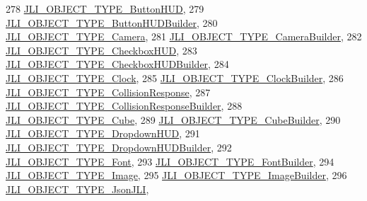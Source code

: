 \begin{DoxyCode}
278     \mbox{\hyperlink{namespacenjli_a6d56d4fbaf89fcf3e3d32839df05b444a62110b03da1994b0e37ca24dd2b03f07}{JLI\_OBJECT\_TYPE\_ButtonHUD}},
279     \mbox{\hyperlink{namespacenjli_a6d56d4fbaf89fcf3e3d32839df05b444a24f3abae4380331c9e4fc0e6dd98d990}{JLI\_OBJECT\_TYPE\_ButtonHUDBuilder}},
280     \mbox{\hyperlink{namespacenjli_a6d56d4fbaf89fcf3e3d32839df05b444a584b5378242583bfb37a7dc963809cd4}{JLI\_OBJECT\_TYPE\_Camera}},
281     \mbox{\hyperlink{namespacenjli_a6d56d4fbaf89fcf3e3d32839df05b444a1bf94aa0f345c5e503277edd7e9a3639}{JLI\_OBJECT\_TYPE\_CameraBuilder}},
282     \mbox{\hyperlink{namespacenjli_a6d56d4fbaf89fcf3e3d32839df05b444aeea430e40ffbf6287e6f45b92283f5c6}{JLI\_OBJECT\_TYPE\_CheckboxHUD}},
283     \mbox{\hyperlink{namespacenjli_a6d56d4fbaf89fcf3e3d32839df05b444a30766bd9b3a037c8cdf8b8ee28f19b42}{JLI\_OBJECT\_TYPE\_CheckboxHUDBuilder}},
284     \mbox{\hyperlink{namespacenjli_a6d56d4fbaf89fcf3e3d32839df05b444a767c5c9686befe91336f8f4f6f29e260}{JLI\_OBJECT\_TYPE\_Clock}},
285     \mbox{\hyperlink{namespacenjli_a6d56d4fbaf89fcf3e3d32839df05b444a485adc2590e096485b63286c788a8c17}{JLI\_OBJECT\_TYPE\_ClockBuilder}},
286     \mbox{\hyperlink{namespacenjli_a6d56d4fbaf89fcf3e3d32839df05b444af8ce52738a5eaa88f7a9d117c0f540b7}{JLI\_OBJECT\_TYPE\_CollisionResponse}},
287     \mbox{\hyperlink{namespacenjli_a6d56d4fbaf89fcf3e3d32839df05b444aca96e33eb2a43c80baafa6b3eda76e3a}{JLI\_OBJECT\_TYPE\_CollisionResponseBuilder}},
288     \mbox{\hyperlink{namespacenjli_a6d56d4fbaf89fcf3e3d32839df05b444adbf14f548d0deb2a84a8a1b3d09bd154}{JLI\_OBJECT\_TYPE\_Cube}},
289     \mbox{\hyperlink{namespacenjli_a6d56d4fbaf89fcf3e3d32839df05b444af701d97c06bbbed74b71cf411a0603a1}{JLI\_OBJECT\_TYPE\_CubeBuilder}},
290     \mbox{\hyperlink{namespacenjli_a6d56d4fbaf89fcf3e3d32839df05b444a3968716659c91fd4e987e9457e406438}{JLI\_OBJECT\_TYPE\_DropdownHUD}},
291     \mbox{\hyperlink{namespacenjli_a6d56d4fbaf89fcf3e3d32839df05b444ab9cc17fc8fcfbe7309f0406fe69a94b4}{JLI\_OBJECT\_TYPE\_DropdownHUDBuilder}},
292     \mbox{\hyperlink{namespacenjli_a6d56d4fbaf89fcf3e3d32839df05b444a7c098ff563bd0f745a222f1c38d52156}{JLI\_OBJECT\_TYPE\_Font}},
293     \mbox{\hyperlink{namespacenjli_a6d56d4fbaf89fcf3e3d32839df05b444a5e35bb12a3036c88f6296758787c0b86}{JLI\_OBJECT\_TYPE\_FontBuilder}},
294     \mbox{\hyperlink{namespacenjli_a6d56d4fbaf89fcf3e3d32839df05b444a09495040dd94be9914a21e6c6d4e9a5d}{JLI\_OBJECT\_TYPE\_Image}},
295     \mbox{\hyperlink{namespacenjli_a6d56d4fbaf89fcf3e3d32839df05b444acf74028d2f297bab038e3ef5fd78c546}{JLI\_OBJECT\_TYPE\_ImageBuilder}},
296     \mbox{\hyperlink{namespacenjli_a6d56d4fbaf89fcf3e3d32839df05b444af7bfdf2cd0273bc42d0dd68f7a5ccdef}{JLI\_OBJECT\_TYPE\_JsonJLI}},

\end{DoxyCode}
